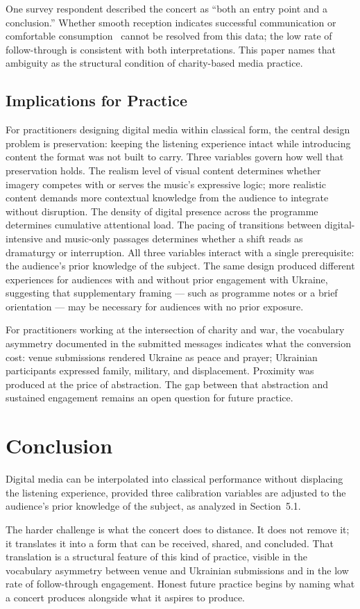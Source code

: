 \documentclass[sigconf,anonymous,review]{acmart}
\begin{document}
One survey respondent described the concert as ``both an entry point and a conclusion.''
Whether smooth reception indicates successful communication or comfortable
consumption~\cite{Sontag2003} cannot be resolved from this data; the low rate of
follow-through is consistent with both interpretations.
This paper names that ambiguity as the structural condition of charity-based media
practice.

\subsection{Implications for Practice}

For practitioners designing digital media within classical form, the central design problem
is preservation: keeping the listening experience intact while introducing content the
format was not built to carry.
Three variables govern how well that preservation holds.
The realism level of visual content determines whether imagery competes with or serves
the music's expressive logic; more realistic content demands more contextual knowledge
from the audience to integrate without disruption.
The density of digital presence across the programme determines cumulative attentional
load.
The pacing of transitions between digital-intensive and music-only passages determines
whether a shift reads as dramaturgy or interruption.
All three variables interact with a single prerequisite: the audience's prior knowledge
of the subject.
The same design produced different experiences for audiences with and without prior
engagement with Ukraine, suggesting that supplementary framing --- such as programme notes
or a brief orientation --- may be necessary for audiences with no prior exposure.

For practitioners working at the intersection of charity and war, the vocabulary asymmetry
documented in the submitted messages indicates what the conversion cost: venue submissions
rendered Ukraine as peace and prayer; Ukrainian participants expressed family, military,
and displacement.
Proximity was produced at the price of abstraction.
The gap between that abstraction and sustained engagement remains an open question for
future practice.

\section{Conclusion}

Digital media can be interpolated into classical performance without displacing the
listening experience, provided three calibration variables are adjusted to the audience's
prior knowledge of the subject, as analyzed in Section~5.1.

The harder challenge is what the concert does to distance.
It does not remove it; it translates it into a form that can be received, shared, and
concluded.
That translation is a structural feature of this kind of practice, visible in the
vocabulary asymmetry between venue and Ukrainian submissions and in the low rate of
follow-through engagement.
Honest future practice begins by naming what a concert produces alongside what it
aspires to produce.



\end{document}
